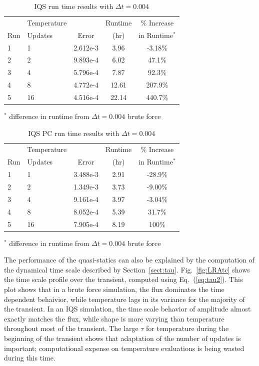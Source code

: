 \documentclass{anstrans}
\newcommand{\eqt}[1]{Eq.~(\ref{#1})}                     %
\newcommand{\fig}[1]{Fig.~\ref{#1}}                      %
\newcommand{\sct}[1]{Section~\ref{#1}}                   %
\begin{document}
\begin{table}[!htbp]
\begin{center}
\begin{tabular}{|l|l|ccc|}
\hline
	&  Temperature 	&  		& Runtime 	& \% Increase	\\
Run	&  Updates 	& Error & (hr)		& in Runtime$^*$\\
\hline
1	& 1		& 2.612e-3 	& 3.96 	& -3.18\%	\\
2	& 2		& 9.893e-4 	& 6.02	&  47.1\%	\\
3 	& 4 	& 5.796e-4 	& 7.87	&  92.3\%	\\
4 	& 8 	& 4.772e-4 	& 12.61	& 207.9\% 	\\
5 	& 16	& 4.516e-4 	& 22.14	& 440.7\%	\\
\hline
\end{tabular}
\end{center}
\vspace{-3mm}
$^*$ difference in runtime from $\Delta t = 0.004$ brute force 
\caption{IQS run time results with $\Delta t = 0.004$}
\label{tab:iqs_lra}
\end{table}

\begin{table}[!htbp]
\begin{center}
\begin{tabular}{|l|l|ccc|}
\hline
	&  Temperature 	&  		& Runtime 	& \% Increase	\\
Run	&  Updates 	& Error & (hr)		& in Runtime$^*$\\
\hline
1	& 1		& 3.488e-3 	& 2.91 	& -28.9\%	\\
2	& 2		& 1.349e-3 	& 3.73	& -9.00\%	\\
3 	& 4 	& 9.161e-4 	& 3.97	& -3.04\%	\\
4 	& 8 	& 8.052e-4 	& 5.39	&  31.7\%	\\
5 	& 16	& 7.905e-4 	& 8.19	&  100\%	\\
\hline
\end{tabular}
\end{center}
\vspace{-3mm}
$^*$ difference in runtime from $\Delta t = 0.004$ brute force 
\caption{IQS PC run time results with $\Delta t = 0.004$}
\label{tab:iqspc_lra}
\end{table}

The performance of the quasi-statics can also be explained by the computation of the dynamical time scale described by \sct{sect:tau}.  \fig{fig:LRAtc} shows the time scale profile over the transient, computed using \eqt{eq:tau2}.  This plot shows that in a brute force simulation, the flux dominates the time dependent behaivior, while temperature lags in its variance for the majority of the transient.  In an IQS simulation, the time scale behavior of amplitude almost exactly matches the flux, while shape is more varying than temperature throughout most of the transient.  The large $\tau$ for temperature during the beginning of the transient shows that adaptation of the number of updates is important; computational expense on temperature evaluations is being wasted during this time.
\end{document}
